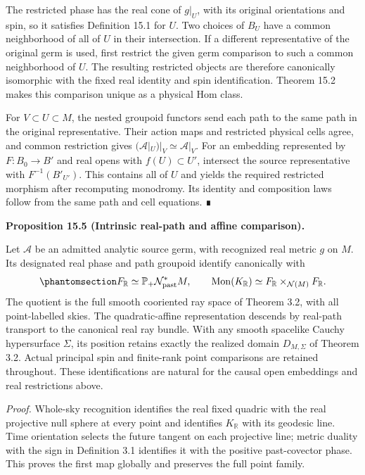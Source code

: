 \documentclass[
  english,
  11pt,
  reqno]{amsart}
\makeatletter
\newcommand{\pandocstatementheading}[1]{%
  \par\addpenalty{\@beginparpenalty}%
  \addvspace{.5\baselineskip plus .2\baselineskip minus .2\baselineskip}%
  {\normalfont\bfseries #1\par}%
  \nobreak\@afterindenttrue\@afterheading
}
\makeatother
\begin{document}
The restricted phase has the real cone of \(g|_U\), with its original
orientations and spin, so it satisfies Definition 15.1 for \(U\). Two
choices of \(B_U\) have a common neighborhood of all of \(U\) in their
intersection. If a different representative of the original germ is
used, first restrict the given germ comparison to such a common
neighborhood of \(U\). The resulting restricted objects are therefore
canonically isomorphic with the fixed real identity and spin
identification. Theorem 15.2 makes this comparison unique as a physical
Hom class.

For \(V\subset U\subset M\), the nested groupoid functors send each path
to the same path in the original representative. Their action maps and
restricted physical cells agree, and common restriction gives
\((\mathcal A|_U)|_V\simeq\mathcal A|_V\). For an embedding represented
by \(F:B_0\to B'\) and real opens with \(f(U)\subset U'\), intersect the
source representative with \(F^{-1}(B'_{U'})\). This contains all of
\(U\) and yields the required restricted morphism after recomputing
monodromy. Its identity and composition laws follow from the same path
and cell equations. ∎

\pandocstatementheading{\protect{}\label{prop:analytic-intrinsic-real-path-comparison}Proposition 15.5 (Intrinsic real-path and affine comparison).}

Let \(\mathcal A\) be an admitted analytic source germ, with recognized
real metric \(g\) on \(M\). Its designated real phase and path groupoid
identify canonically with
\begin{equation}\protect\phantomsection\label{eq:analytic-real-intrinsic-path-comparison}{
F_{\mathbb R}
\simeq \mathbb P_+\mathcal N^*_{\mathrm{past}}M,
\qquad
\operatorname{Mon}(K_{\mathbb R})
\simeq F_{\mathbb R}\times_{\mathcal N(M)}F_{\mathbb R}.
}\end{equation} The quotient is the full smooth cooriented ray space of
Theorem 3.2, with all point-labelled skies. The quadratic-affine
representation descends by real-path transport to the canonical real ray
bundle. With any smooth spacelike Cauchy hypersurface \(\Sigma\), its
position retains exactly the realized domain \(D_{M,\Sigma}\) of Theorem
3.2. Actual principal spin and finite-rank point comparisons are
retained throughout. These identifications are natural for the causal
open embeddings and real restrictions above.

\emph{Proof.} Whole-sky recognition identifies the real fixed quadric
with the real projective null sphere at every point and identifies
\(K_{\mathbb R}\) with its geodesic line. Time orientation selects the
future tangent on each projective line; metric duality with the sign in
Definition 3.1 identifies it with the positive past-covector phase. This
proves the first map globally and preserves the full point family.
\end{document}
